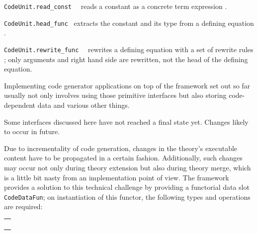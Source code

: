 \begin{isabellebody}
\begin{isamarkuptext}
  \begin{description}

  \item \verb|CodeUnit.read_const|~~
     reads a constant as a concrete term expression .

  \item \verb|CodeUnit.head_func|~
     extracts the constant and its type from a defining equation .

  \item \verb|CodeUnit.rewrite_func|~~
     rewrites a defining equation  with a set of rewrite
     rules ; only arguments and right hand side are rewritten,
     not the head of the defining equation.

  \end{description}%
\end{isamarkuptext}%
\isamarkuptrue%
%
\endisatagmlref
{\isafoldmlref}%
%
\isadelimmlref
%
\endisadelimmlref
%
\isamarkuptrue%
%
\begin{isamarkuptext}%
Implementing code generator applications on top
  of the framework set out so far usually not only
  involves using those primitive interfaces
  but also storing code-dependent data and various
  other things.

  \begin{warn}
    Some interfaces discussed here have not reached
    a final state yet.
    Changes likely to occur in future.
  \end{warn}%
\end{isamarkuptext}%
\isamarkuptrue%
%
\isamarkuptrue%
%
\begin{isamarkuptext}%
Due to incrementality of code generation, changes in the
  theory's executable content have to be propagated in a
  certain fashion.  Additionally, such changes may occur
  not only during theory extension but also during theory
  merge, which is a little bit nasty from an implementation
  point of view.  The framework provides a solution
  to this technical challenge by providing a functorial
  data slot \verb|CodeDataFun|; on instantiation
  of this functor, the following types and operations
  are required:

  \medskip
  \begin{tabular}{l}
  \isa{type\ T} \\
  \isa{val\ empty{\isacharcolon}\ T} \\
  \isa{val\ merge{\isacharcolon}\ Pretty{\isachardot}pp\ {\isasymrightarrow}\ T\ {\isacharasterisk}\ T\ {\isasymrightarrow}\ T} \\
  \isa{val\ purge{\isacharcolon}\ theory\ option\ {\isasymrightarrow}\ CodeUnit{\isachardot}const\ list\ option\ {\isasymrightarrow}\ T\ {\isasymrightarrow}\ T}
  \end{tabular}


\end{isamarkuptext}
\end{isabellebody}
